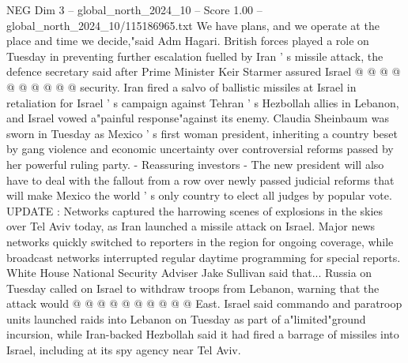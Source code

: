 \begin{textsample}{NEG Dim 3 – global\_north\_2024\_10 – Score 1.00 – global\_north\_2024\_10/115186965.txt}
We have plans, and we operate at the place and time we decide,"said Adm Hagari.
British forces played a role on Tuesday in preventing further escalation fuelled by Iran ' s missile attack, the defence secretary said after Prime Minister Keir Starmer assured Israel @ @ @ @ @ @ @ @ @ @ security.
Iran fired a salvo of ballistic missiles at Israel in retaliation for Israel ' s campaign against Tehran ' s Hezbollah allies in Lebanon, and Israel vowed a"painful response"against its enemy.
Claudia Sheinbaum was sworn in Tuesday as Mexico ' s first woman president, inheriting a country beset by gang violence and economic uncertainty over controversial reforms passed by her powerful ruling party. - Reassuring investors - The new president will also have to deal with the fallout from a row over newly passed judicial reforms that will make Mexico the world ' s only country to elect all judges by popular vote.
UPDATE : Networks captured the harrowing scenes of explosions in the skies over Tel Aviv today, as Iran launched a missile attack on Israel.
Major news networks quickly switched to reporters in the region for ongoing coverage, while broadcast networks interrupted regular daytime programming for special reports.
White House National Security Adviser Jake Sullivan said that...
Russia on Tuesday called on Israel to withdraw troops from Lebanon, warning that the attack would @ @ @ @ @ @ @ @ @ @ East.
Israel said commando and paratroop units launched raids into Lebanon on Tuesday as part of a"limited"ground incursion, while Iran-backed Hezbollah said it had fired a barrage of missiles into Israel, including at its spy agency near Tel Aviv.

\end{textsample}
